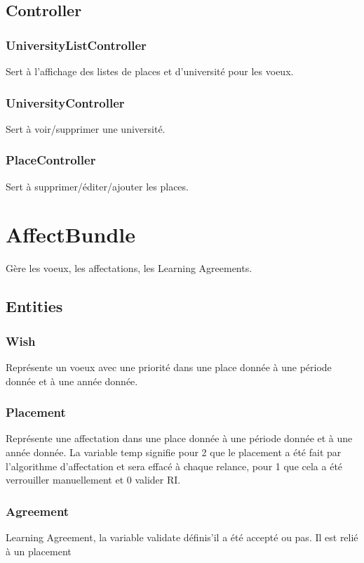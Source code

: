 \subsection{Controller}
\subsubsection{UniversityListController}
Sert à l'affichage des listes de places et d'université pour les voeux.

\subsubsection{UniversityController}
Sert à voir/supprimer une université. 

\subsubsection{PlaceController}
Sert à supprimer/éditer/ajouter les places.


\section{AffectBundle}
Gère les voeux, les affectations, les Learning Agreements.
\subsection{Entities}
\subsubsection{Wish}
Représente un voeux avec une priorité dans une place donnée à une période donnée et à une année donnée.

\subsubsection{Placement}
Représente une affectation dans une place donnée à une période donnée et à une année donnée. La variable temp signifie pour 2 que le placement a été fait par l'algorithme d'affectation et sera effacé à chaque relance, pour 1 que cela a été verrouiller manuellement et 0 valider RI.

\subsubsection{Agreement}
Learning Agreement, la variable validate définis'il a été accepté ou pas. Il est relié à un placement

